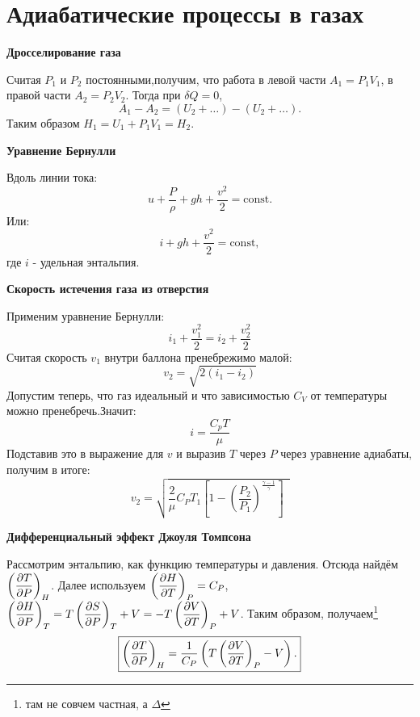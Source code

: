\section{Адиабатические процессы в газах}

\noindent
\textbf{Дросселирование газа} 

Считая $P_1$ и $P_2$ постоянными,получим, что работа в левой части $A_1 = P_1 V_1$,  в правой части $A_2 = P_2 V_2$. Тогда при $\delta Q = 0$,
$$
A_1 - A_2 =  \left(
U_2 + \dots
\right) - 
\left(
U_2 + \dots
\right).
$$
Таким образом $H_1 = U_1 + P_1 V_1 = H_2$. 

\phantom{42}

\noindent
\textbf{Уравнение Бернулли}

Вдоль линии тока:
\begin{equation}
    u + \frac{P}{\rho} + g h + \frac{v^2}{2} = \text{const}.
\end{equation}
Или:
\begin{equation}
\label{eq1}
   i  + g h + \frac{v^2}{2} = \text{const},
\end{equation}
где $i$ - удельная энтальпия.

\phantom{42}

\noindent
\textbf{Скорость истечения газа из отверстия}

Применим уравнение Бернулли:
$$ i_1 + \frac{v_1^2}{2} =  i_2 + \frac{v_2^2}{2} $$
Считая скорость $v_1$ внутри баллона пренебрежимо малой:
$$v_2 = \sqrt{2(i_1 - i_2)} $$
Допустим теперь, что газ идеальный и что зависимостью $C_V$ от температуры можно пренебречь.Значит:
$$ i = \frac {C_p T}{\mu}$$
Подставив это в выражение для $v$ и выразив $T$ через $P$ через уравнение адиабаты, получим в итоге:
\begin{equation}
    v_2 = \sqrt {\frac{2}{\mu} C_P T_1\left[1 - \left( \frac{P_2}{P_1} \right)^{\frac{\gamma - 1}{\gamma}}\right] \phantom{9}}
\end{equation}

\phantom{42}

\noindent
\textbf{Дифференциальный эффект Джоуля Томпсона} 

Рассмотрим энтальпию, как функцию температуры и давления. Отсюда найдём $\left(\dfrac{\partial {T}}{\partial {P}} \right)_{H}$. Далее используем $\left(\dfrac{\partial {H}}{\partial {T}} \right)_{P}=C_P$, $\left(\dfrac{\partial {H}}{\partial {P}} \right)_{T} = T \left(\dfrac{\partial {S}}{\partial {P}} \right)_{T} + V = - T \left(\dfrac{\partial {V}}{\partial {T}} \right)_{P} + V$. Таким образом, получаем\footnote{там не совчем частная, а $\Delta$}
\begin{equation}
\boxed{
    \label{jte}
    \left(\dfrac{\partial {T}}{\partial {P}} \right)_{H} = \frac{1}{C_P} \left(
    T \left(\dfrac{\partial {V}}{\partial {T}} \right)_{P} - V
    \right).
}
\end{equation}

